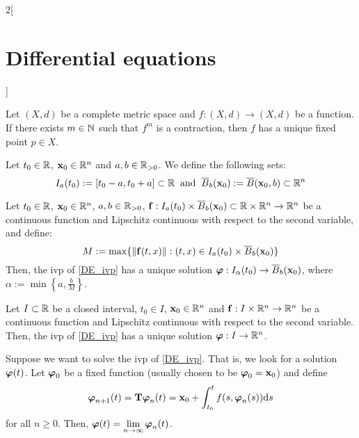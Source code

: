 \documentclass[../../../main.tex]{subfiles}
\begin{document}
\begin{multicols}{2}[\section{Differential equations}]
\begin{theorem}
  \end{theorem}
  \begin{corollary}
    Let $(X,d)$ be a complete metric space and $f:(X,d)\rightarrow (X,d)$ be a function. If there exists $m\in\mathbb{N}$ such that $f^m$ is a contraction, then $f$ has a unique fixed point $p\in X$.
  \end{corollary}
  \begin{definition}
    Let $t_0\in\mathbb{R}$, $\boldsymbol{\mathrm{x}}_0\in\mathbb{R}^n$ and $a,b\in\mathbb{R}_{>0}$. We define the following sets: $$I_a(t_0):=[t_0-a,t_0+a]\subset\mathbb{R}\;\;\text{and}\;\;\overline{B}_{b}(\boldsymbol{\mathrm{x}}_0):=\overline{B}(\boldsymbol{\mathrm{x}}_0,b)\subset\mathbb{R}^n$$
  \end{definition}
  \begin{theorem}\label{DE_picard}
    Let $t_0\in\mathbb{R}$, $\boldsymbol{\mathrm{x}}_0\in\mathbb{R}^n$, $a,b\in\mathbb{R}_{>0}$, $\boldsymbol{\mathrm{f}}:I_a(t_0)\times\overline{B}_{b}(\boldsymbol{\mathrm{x}}_0)\subset\mathbb{R}\times\mathbb{R}^n\rightarrow\mathbb{R}^n$ be a continuous function and Lipschitz continuous with respect to the second variable, and define: $$M:=\max\{\|\boldsymbol{\mathrm{f}}(t,x)\|:(t,x)\in I_a(t_0)\times\overline{B}_{b}(\boldsymbol{\mathrm{x}}_0)\}$$ Then, the ivp of \cref{DE_ivp} has a unique solution $\boldsymbol{\mathrm{\varphi}}:I_\alpha(t_0)\rightarrow\overline{B}_{b}(\boldsymbol{\mathrm{x}}_0)$, where $\alpha:=\min\left\{a,\frac{b}{M}\right\}$.
  \end{theorem}
  \begin{corollary}
    Let $I\subset \mathbb{R}$ be a closed interval, $t_0\in I$, $\boldsymbol{\mathrm{x}}_0\in\mathbb{R}^n$ and $\boldsymbol{\mathrm{f}}:I\times\mathbb{R}^n\rightarrow\mathbb{R}^n$ be a continuous function and Lipschitz continuous with respect to the second variable. Then, the ivp of \cref{DE_ivp} has a unique solution $\boldsymbol{\mathrm{\varphi}}:I\rightarrow\mathbb{R}^n$.
  \end{corollary}
  \begin{corollary}
    Suppose we want to solve the ivp of \cref{DE_ivp}. That is, we look for a solution $\boldsymbol{\mathrm{\varphi}}(t)$. Let $\boldsymbol{\mathrm{\varphi}}_0$ be a fixed function (usually chosen to be $\boldsymbol{\mathrm{\varphi}}_0=\boldsymbol{\mathrm{x}}_0$) and define
    $$\boldsymbol{\mathrm{\varphi}}_{n+1}(t)=\boldsymbol{\mathrm{T}}\boldsymbol{\mathrm{\varphi}}_n(t)=\boldsymbol{\mathrm{x}}_0+\int_{t_0}^tf(s,\boldsymbol{\mathrm{\varphi}}_n(s))\dd s$$
    for all $n\geq 0$. Then, $\displaystyle\boldsymbol{\mathrm{\varphi}}(t)=\lim_{n\to\infty}\boldsymbol{\mathrm{\varphi}}_n(t)$.
  \end{corollary}
  \begin{corollary}

\end{corollary}
\end{multicols}
\end{document}
